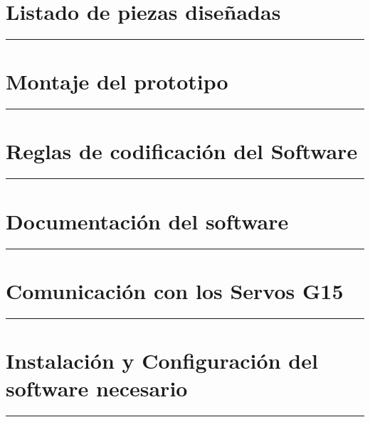 \appendix
{}


     \chapter{Listado de piezas diseñadas} \label{app:listadoPiezas}
         \hrule
         \vspace{3mm}
     	 
    	
     \chapter{Montaje del prototipo} \label{app:montajePiezas}
         \hrule
         \vspace{3mm}
    	
     \chapter{Reglas de codificación del Software} \label{app:codificacionSW}
        \hrule
        \vspace{3mm}
     	
    
     \chapter{Documentación del software} \label{app:documentacion_software}
         \hrule
         \vspace{3mm}
     	 
     	 
     \chapter{Comunicación con los Servos G15} \label{app:registros_g15}
	     \hrule
	     \vspace{3mm}
	     
	      

     \chapter{Instalación y Configuración del software necesario} \label{app:instalacion_software}
         \hrule
         \vspace{3mm}
         
         
        
